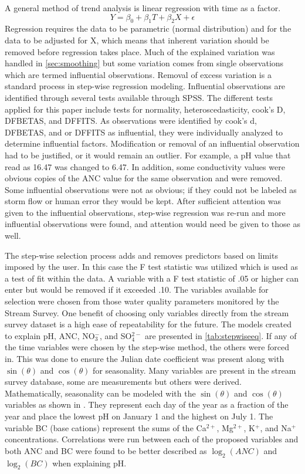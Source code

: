 A general method of trend analysis is linear regression with time as a factor.
\begin{equation} \label{eq:regression}
    Y={\beta_0 + \beta_1  T + \beta_2  X + \epsilon}
\end{equation}
Regression requires the data to be parametric (normal distribution) and for the data to be adjusted for X, which means that inherent variation should be removed before regression takes place.
Much of the explained variation was handled in \autoref{sec:smoothing} but some variation comes from single observations which are termed influential observations.
Removal of excess variation is a standard process in step-wise regression modeling.
Influential observations are identified through several tests available through SPSS.
The different tests applied for this paper include tests for normality, heteroscedasticity, cook's D, DFBETAS, and DFFITS. 
As observations were identified by cook's d, DFBETAS, and or DFFITS as influential, they were individually analyzed to determine influential factors. 
Modification or removal of an influential observation had to be justified, or it would remain an outlier. 
For example, a pH value that read as 16.47 was changed to 6.47.
In addition, some conductivity values were obvious copies of the ANC value for the same observation and were removed.
Some influential observations were not as obvious; if they could not be labeled as storm flow or human error they would be kept.
After sufficient attention was given to the influential observations, step-wise regression was re-run and more influential observations were found, and attention would need be given to those as well. 

The step-wise selection process adds and removes predictors based on limits imposed by the user.
In this case the F test statistic was utilized which is used as a test of fit within the data.
A variable with a F test statistic of .05 or higher can enter but would be removed if it exceeded .10. 
The variables available for selection were chosen from those water quality parameters monitored by the Stream Survey. 
One benefit of choosing only variables directly from the stream survey dataset is a high ease of repeatability for the future. 
The models created to explain pH, ANC, NO$_3^-$, and SO$_4^{2-}$ are presented in \autoref{tab:stepwiseeq}.
If any of the time variables were chosen by the step-wise method, the others were forced in.  
This was done to ensure the Julian date coefficient was present along with $\sin(\theta)$ and $\cos(\theta)$ for seasonality.  
Many variables are present in the stream survey database, some are measurements but others were derived.  
Mathematically, seasonality can be modeled with the $\sin(\theta)$ and $\cos(\theta)$ variables as shown in \citet{helsel1992statistical}. 
They represent each day of the year as a fraction of the year and place the lowest pH on January 1 and the highest on July 1.  
The variable BC (base cations) represent the sums of the Ca$^{2+}$, Mg$^{2+}$, K$^+$, and Na$^+$ concentrations.  
Correlations were run between each of the proposed variables  and both ANC and BC were found to be better described as $\log_2(ANC)$ and $\log_2(BC)$ when explaining pH.
 
